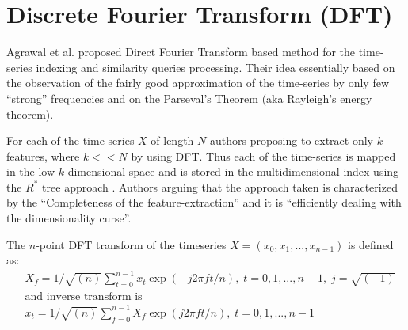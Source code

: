 \section{Discrete Fourier Transform (DFT)}
Agrawal et al. \cite{citeulike:3973409} proposed Direct Fourier Transform based method for the time-series indexing and similarity queries processing. Their idea essentially based on the observation of the fairly good approximation of the time-series by only few ``strong'' frequencies and on the Parseval's Theorem (aka Rayleigh's energy theorem). 

For each of the time-series $X$ of length $N$ authors proposing to extract only $k$ features, where $k<<N$ by using DFT. Thus each of the time-series is mapped in the low $k$ dimensional space and is stored in the multidimensional index using the $R^{*}$ tree approach \cite{citeulike:343069}. Authors arguing that the approach taken is characterized by the ``Completeness of the feature-extraction'' and it is ``efficiently dealing with the dimensionality curse''. 

The $n$-point DFT transform of the timeseries $X=(x_{0}, x_{1}, ... , x_{n-1})$ is defined as:
\begin{align}
& X_{f} = 1/\sqrt{(n)}\sum_{t=0}^{n-1} x_{t} \exp(-j2 \pi f t/n),\; t=0,1,...,n-1, \; j=\sqrt{(-1)} \\
& \text{and inverse transform is } \\
& x_{t} = 1/\sqrt{(n)}\sum_{f=0}^{n-1} X_{f} \exp(j2 \pi f t/n),\; t=0,1,...,n-1 
\end{align}
